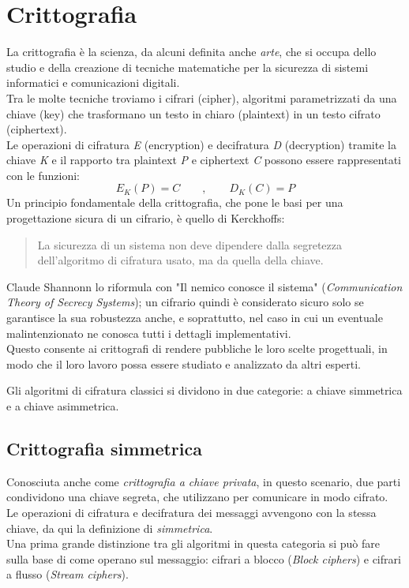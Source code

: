 \documentclass[target=bach,aauheader=,style=]{thud}
\begin{document}
    \section{Crittografia}
    La crittografia è la scienza, da alcuni definita anche \textit{arte}, che si occupa dello studio e della creazione di tecniche matematiche per la sicurezza di sistemi informatici e comunicazioni digitali.\cite{moderncrypto}\\
    Tra le molte tecniche troviamo i cifrari (cipher), algoritmi parametrizzati da una chiave (key) che trasformano un testo in chiaro (plaintext) in un testo cifrato (ciphertext).\\
    Le operazioni di cifratura \textit{E} (encryption) e decifratura \textit{D} (decryption) tramite la chiave \textit{K} e il rapporto tra plaintext \textit{P} e ciphertext \textit{C} possono essere rappresentati con le funzioni:
    \[E_K(P)=C \qquad , \qquad D_K(C)=P\]
    Un principio fondamentale della crittografia, che pone le basi per una progettazione sicura di un cifrario, è quello di Kerckhoffs:
    \begin{quote}
        La sicurezza di un sistema non deve dipendere dalla segretezza dell'algoritmo di cifratura usato, ma da quella della chiave.
    \end{quote}
    Claude Shannonn lo riformula con "Il nemico conosce il sistema" (\textit{Communication Theory of Secrecy Systems}); un cifrario quindi è considerato sicuro solo se garantisce la sua robustezza anche, e soprattutto, nel caso in cui un eventuale malintenzionato ne conosca tutti i dettagli implementativi.\\
    Questo consente ai crittografi di rendere pubbliche le loro scelte progettuali, in modo che il loro lavoro possa essere studiato e analizzato da altri esperti.
    
    Gli algoritmi di cifratura classici si dividono in due categorie: a chiave simmetrica e a chiave asimmetrica.

        \subsection{Crittografia simmetrica}
        Conosciuta anche come \textit{crittografia a chiave privata}, in questo scenario, due parti condividono una chiave segreta, che utilizzano per comunicare in modo cifrato.\\
        Le operazioni di cifratura e decifratura dei messaggi avvengono con la stessa chiave, da qui la definizione di \textit{simmetrica}. \\
        Una prima grande distinzione tra gli algoritmi in questa categoria si può fare sulla base di come operano sul messaggio: cifrari a blocco (\textit{Block ciphers}) e cifrari a flusso (\textit{Stream ciphers}).
\end{document}
